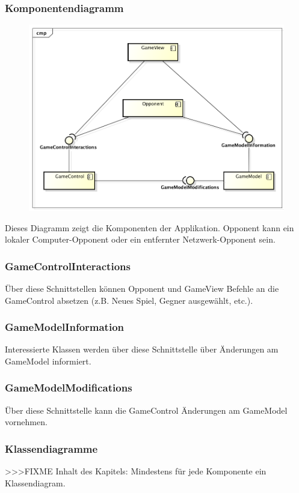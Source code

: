 \documentclass[a4paper, 10pt, fleqn]{article}
\begin{document}
\subsubsection{Komponentendiagramm}
\begin{figure}[h!]
    \center
    \includegraphics[width=\textwidth]{fig/components.png}
\end{figure}
Dieses Diagramm zeigt die Komponenten der Applikation. Opponent kann ein 
lokaler Computer-Opponent oder ein entfernter Netzwerk-Opponent sein.

\subsubsection*{GameControlInteractions}
Über diese Schnittstellen können Opponent und GameView Befehle an die 
GameControl absetzen (z.B. Neues Spiel, Gegner ausgewählt, etc.).

\subsubsection*{GameModelInformation}
Interessierte Klassen werden über diese Schnittstelle über Änderungen am 
GameModel informiert.

\subsubsection*{GameModelModifications}
Über diese Schnittstelle kann die GameControl Änderungen am GameModel 
vornehmen.

\subsubsection{Klassendiagramme}
>>>FIXME Inhalt des Kapitels: Mindestens für jede Komponente ein Klassendiagram.
\end{document}
